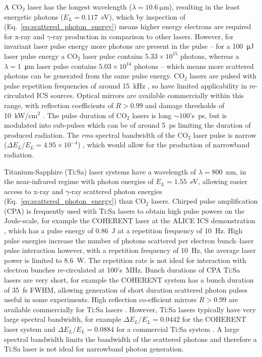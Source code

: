 \documentclass[../main.tex]{subfiles}
\begin{document}
A CO$_{2}$ laser has the longest wavelength ($\lambda=10.6~\si{\micro\meter}$), resulting in the least energetic photons ($E_{L}=0.117$~\si{\electronvolt}), which by inspection of (Eq.~\ref{eq:scattered_photon_energy}) means higher energy electrons are required for x-ray and $\gamma$-ray production in comparison to other lasers. However, for invariant laser pulse energy more photons are present in the pulse -- for a 100~\si{\micro\joule} laser pulse energy a CO$_{2}$ laser pulse contains $5.33\times 10^{15}$ photons, whereas a $\lambda=1$~\si{\micro\meter} laser pulse contains $5.03\times 10^{14}$ photons -- which means more scattered photons can be generated from the same pulse energy. CO$_{2}$ lasers are pulsed with pulse repetition frequencies of around 15~\si{\kilo\hertz} \cite{pogorelsky2020converting}, so have limited applicability in re-circulated ICS sources. Optical mirrors are available commercially within this range, with reflection coefficients of $R>0.99$ and damage thresholds of 10~\si{\kilo\watt}/\si{\centi\meter}$^{2}$ \cite{thorlabs2021co2optics}. The pulse duration of CO$_{2}$ lasers is long $\sim 100$'s~\si{\pico\second}, but is modulated into sub-pulses which can be of around 5~\si{\pico\second} \cite{pogorelsky2020converting, ovodenko2016high} limiting the duration of produced radiation. The \textit{rms} spectral bandwidth of the CO$_{2}$ laser pulse is narrow ($\Delta E_{L}/E_{L} = 4.95\times 10^{-4}$) \cite{tochitsky2016prospects}, which would allow for the production of narrowband radiation.

Titanium-Sapphire (Ti:Sa) laser systems have a wavelength of $\lambda=800$~\si{\nano\meter}, in the near-infrared regime with photon energies of $E_{L} =1.55$~\si{\electronvolt}, allowing easier access to x-ray and $\gamma$-ray scattered photon energies (Eq.~\ref{eq:scattered_photon_energy}) than CO$_{2}$ lasers. Chirped pulse amplification (CPA) \cite{strickland1985compression} is frequently used with Ti:Sa lasers to obtain high pulse powers on the Joule-scale, for example the COHERENT laser at the ALICE ICS demonstration \cite{priebe2008inverse}, which has a pulse energy of 0.86~\si{\joule} at a repetition frequency of 10~\si{\hertz}. High pulse energies increase the number of photons scattered per electron bunch--laser pulse interaction however, with a repetition frequency of 10~\si{\hertz}, the average laser power is limited to 8.6~\si{\watt}. The repetition rate is not ideal for interaction with electron bunches re-circulated at 100's~\si{\mega\hertz}. Bunch durations of CPA Ti:Sa lasers are very short, for example the COHERENT system has a bunch duration of 35~\si{\femto\second} FWHM,  allowing generation of short duration scattered photon pulses useful in some experiments. High reflection co-efficient mirrors $R>0.99$ are available commercially for Ti:Sa lasers \cite{thorlabs2021tisaoptics}. However, Ti:Sa lasers typically have very large spectral bandwidth, for example $\Delta E_{L}/E_{L} = 0.0442$ for the COHERENT laser system \cite{priebe2008inverse} and $\Delta E_{L}/E_{L}=0.0884$ for a commercial Ti:Sa system \cite{thorlabs2021tisa}. A large spectral bandwidth limits the bandwidth of the scattered photons and therefore a Ti:Sa laser is not ideal for narrowband photon generation.
\end{document}
